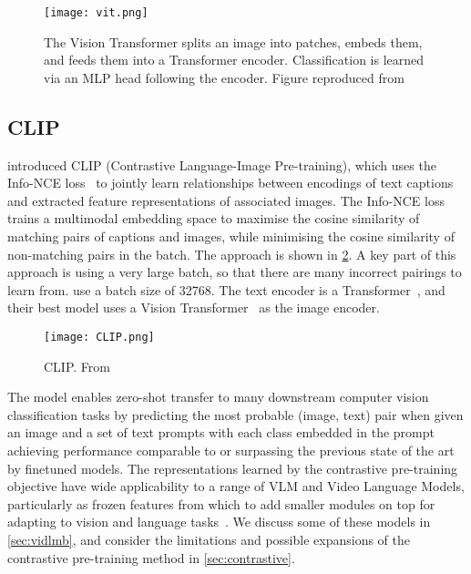 \begin{figure}[htpb]
	\centering
	\texttt{[image: vit.png]}
	\caption{The Vision Transformer splits an image into patches, embeds them,
		and feeds them into a Transformer encoder. Classification is learned
		via an MLP head following the encoder. Figure reproduced
		from~\citet{dosovitskiy2021vit}}
	\label{fig:vit}
\end{figure}


\subsection{CLIP}
\label{ssec:clip}

\citet{radford2021clip} introduced CLIP (Contrastive Language-Image
Pre-training), which uses the Info-NCE loss~\citep{oord2019infonce} to jointly
learn relationships between encodings of text captions and extracted feature
representations of associated images. The Info-NCE loss trains a multimodal
embedding space to maximise the cosine similarity of matching pairs of captions
and images, while minimising the cosine similarity of non-matching pairs in the
batch. The approach is shown in \cref{fig:clip}. A key part of this approach is
using a very large batch, so that there are many incorrect pairings to learn
from. \citet{radford2021clip} use a batch size of 32768. The text encoder is a
Transformer~\citep{vaswani2017attention}, and their best model uses a Vision
Transformer~\citep{dosovitskiy2021vit} as the image encoder.

\begin{figure}[htpb]
	\centering
	\texttt{[image: CLIP.png]}
	\caption{CLIP. From~\citet{radford2021clip}}
	\label{fig:clip}
\end{figure}

The model enables zero-shot transfer to many downstream computer vision
classification tasks by predicting the most probable (image, text) pair when
given an image and a set of text prompts with each class embedded in the prompt
achieving performance comparable to or surpassing the previous state of the art
by finetuned models. The representations learned by the contrastive
pre-training objective have wide applicability to a range of VLM and Video
Language Models, particularly as frozen features from which to add smaller
modules on top for adapting to vision and language
tasks~\citep{alayrac2022flamingo,lin2022evl,lei2021clipbert}. We discuss some
of these models in \cref{sec:vidlmb}, and consider the limitations and possible
expansions of the contrastive pre-training method in \cref{sec:contrastive}.


